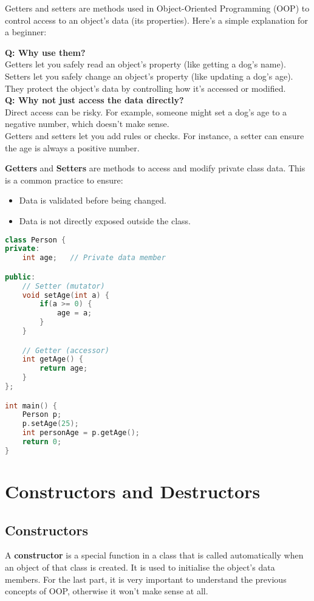 \documentclass[a4paper,12pt]{article}
\begin{document}
Getters and setters are methods used in Object-Oriented Programming (OOP) to control access to an object's data (its properties). Here's a simple explanation for a beginner:

\textbf{Q: Why use them?}\\
Getters let you safely read an object's property (like getting a dog's name).\\
Setters let you safely change an object's property (like updating a dog's age).\\
They protect the object's data by controlling how it's accessed or modified.\\
\textbf{Q: Why not just access the data directly?}\\
Direct access can be risky. For example, someone might set a dog's age to a negative number, which doesn't make sense.\\
Getters and setters let you add rules or checks. For instance, a setter can ensure the age is always a positive number.

\textbf{Getters} and \textbf{Setters} are methods to access and modify private class data. This is a common practice to ensure:
\begin{itemize}
    \item Data is validated before being changed.
    \item Data is not directly exposed outside the class.
\end{itemize}

\begin{lstlisting}[language=C++]
class Person {
private:
    int age;   // Private data member

public:
    // Setter (mutator)
    void setAge(int a) {
        if(a >= 0) {
            age = a;
        }
    }

    // Getter (accessor)
    int getAge() {
        return age;
    }
};

int main() {
    Person p;
    p.setAge(25);
    int personAge = p.getAge();
    return 0;
}
\end{lstlisting}

\section{Constructors and Destructors}
\subsection{Constructors}
A \textbf{constructor} is a special function in a class that is called automatically when an object of that class is created. It is used to initialise the object's data members. For the last part, it is very important to understand the previous concepts of OOP, otherwise it won't make sense at all. 
\end{document}
